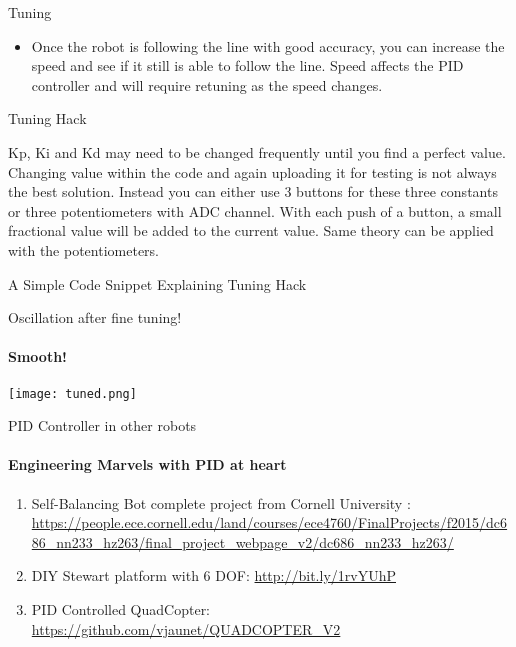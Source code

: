 \documentclass{beamer}
\begin{document}
\begin{frame}[allowframebreaks]{Tuning}
\begin{itemize}
\item{Once the robot is following the line with good accuracy, you can increase the speed and see if it still is able to follow the line. Speed affects the PID controller and will require retuning as the speed changes.}
  		
  		
  	
  	\end{itemize}
  	
  	
  	\begin{alertblock}{Tuning Hack}
  	
		Kp, Ki and Kd may need to be changed frequently until you find a perfect value. Changing value within the code and again uploading it for testing is not always the best solution. Instead you can either use 3 buttons for these three constants or three potentiometers with ADC channel. With each push of a button, a small fractional value will be added to the current value. Same theory can be applied with the potentiometers.
		
		
		  	
  	
  	\end{alertblock}
  	
  	\begin{alertblock}{A Simple Code Snippet Explaining Tuning Hack}
  	
  	\end{alertblock}
		\tuningHack  	
  	
  	
  
  \end{frame}
  
  \begin{frame}{Oscillation after fine tuning!}
  \framesubtitle{Smooth!}
  
  	\texttt{[image: tuned.png]}
  
  \end{frame}
  
  \begin{frame}{PID Controller in other robots}
  \framesubtitle {Engineering Marvels with PID at heart}
  
  
  \begin{enumerate}
		
		\item{Self-Balancing Bot complete project from Cornell University : \url{https://people.ece.cornell.edu/land/courses/ece4760/FinalProjects/f2015/dc686_nn233_hz263/final_project_webpage_v2/dc686_nn233_hz263/}}
		
		\item{DIY Stewart platform with 6 DOF: 
		\url{http://bit.ly/1rvYUhP}}  
		
		\item{PID Controlled QuadCopter:  \url{https://github.com/vjaunet/QUADCOPTER_V2}}
  
  \end{enumerate}
  
  
  \end{frame}
  
\end{document}
